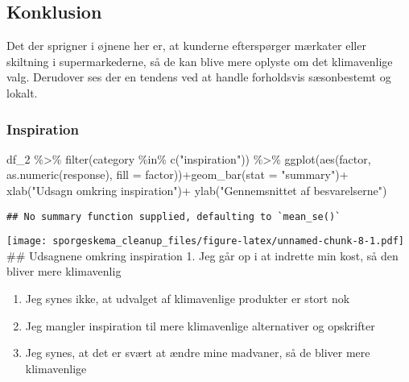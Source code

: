\documentclass[
]{article}
\newenvironment{Shaded}{\begin{snugshade}}{\end{snugshade}}
\newcommand{\AttributeTok}[1]{\textcolor[rgb]{0.77,0.63,0.00}{#1}}
\newcommand{\FunctionTok}[1]{\textcolor[rgb]{0.00,0.00,0.00}{#1}}
\newcommand{\NormalTok}[1]{#1}
\newcommand{\SpecialCharTok}[1]{\textcolor[rgb]{0.00,0.00,0.00}{#1}}
\newcommand{\StringTok}[1]{\textcolor[rgb]{0.31,0.60,0.02}{#1}}
\begin{document}
\hypertarget{konklusion-1}{%
\subsection{Konklusion}\label{konklusion-1}}

Det der sprigner i øjnene her er, at kunderne efterspørger mærkater
eller skiltning i supermarkederne, så de kan blive mere oplyste om det
klimavenlige valg. Derudover ses der en tendens ved at handle
forholdsvis sæsonbestemt og lokalt.

\hypertarget{inspiration}{%
\subsubsection{Inspiration}\label{inspiration}}

\begin{Shaded}
\begin{Highlighting}[]
\NormalTok{df\_2 }\SpecialCharTok{\%\textgreater{}\%} 
  \FunctionTok{filter}\NormalTok{(category }\SpecialCharTok{\%in\%} \FunctionTok{c}\NormalTok{(}\StringTok{"inspiration"}\NormalTok{)) }\SpecialCharTok{\%\textgreater{}\%} 
  \FunctionTok{ggplot}\NormalTok{(}\FunctionTok{aes}\NormalTok{(factor, }\FunctionTok{as.numeric}\NormalTok{(response), }\AttributeTok{fill =}\NormalTok{ factor))}\SpecialCharTok{+}\FunctionTok{geom\_bar}\NormalTok{(}\AttributeTok{stat =} \StringTok{"summary"}\NormalTok{)}\SpecialCharTok{+} 
  \FunctionTok{xlab}\NormalTok{(}\StringTok{"Udsagn omkring inspiration"}\NormalTok{)}\SpecialCharTok{+} \FunctionTok{ylab}\NormalTok{(}\StringTok{"Gennemsnittet af besvarelserne"}\NormalTok{)}
\end{Highlighting}
\end{Shaded}

\begin{verbatim}
## No summary function supplied, defaulting to `mean_se()`
\end{verbatim}

\texttt{[image: sporgeskema\_cleanup\_files/figure-latex/unnamed-chunk-8-1.pdf]}
\#\# Udsagnene omkring inspiration 1. Jeg går op i at indrette min kost,
så den bliver mere klimavenlig

\begin{enumerate}
\def\labelenumi{\arabic{enumi}.}
\setcounter{enumi}{1}
\item
  Jeg synes ikke, at udvalget af klimavenlige produkter er stort nok
\item
  Jeg mangler inspiration til mere klimavenlige alternativer og
  opskrifter
\item
  Jeg synes, at det er svært at ændre mine madvaner, så de bliver mere
  klimavenlige
\end{enumerate}
\end{document}
